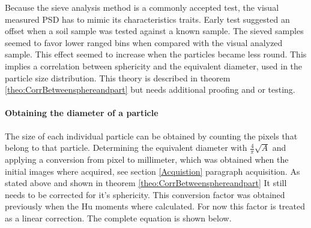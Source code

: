 \documentclass[11pt,fleqn,,a4paper,twoside,openright]{book}
\begin{document}
Because the sieve analysis method is a commonly accepted test, the visual measured PSD has to mimic its characteristics traits. Early test suggested an offset when a soil sample was tested against a known sample. The sieved samples seemed to favor lower ranged bins when compared with the visual analyzed sample. This effect seemed to increase when the particles became less round. This implies a correlation between sphericity and the equivalent diameter, used in the particle size distribution. This theory is described in theorem \ref{theo:CorrBetweensphereandpart} but needs additional proofing and or testing.

\paragraph{Obtaining the diameter of a particle}
The size of each individual particle can be obtained by counting the pixels that belong to that particle. Determining the equivalent diameter with $ \frac{4}{\pi}\sqrt{A} $ and applying a conversion from pixel to millimeter, which was obtained when the initial images where acquired, see section \ref{Acquistion} paragraph acquisition. As stated above and shown in theorem \ref{theo:CorrBetweensphereandpart} It still needs to be corrected for it's sphericity. This conversion factor was obtained previously when the Hu moments where calculated. For now this factor is treated as a linear correction. The complete equation is shown below.
\end{document}
